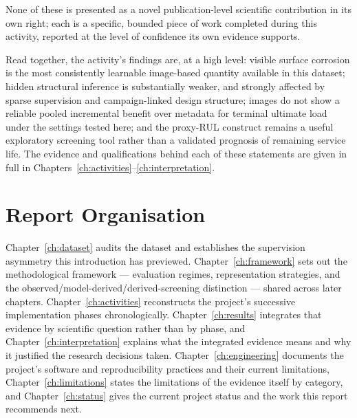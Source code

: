 None of these is presented as a novel publication-level scientific
contribution in its own right; each is a specific, bounded piece of work
completed during this activity, reported at the level of confidence its
own evidence supports.

Read together, the activity's findings are, at a high level: visible
surface corrosion is the most consistently learnable image-based quantity
available in this dataset; hidden structural inference is substantially
weaker, and strongly affected by sparse supervision and campaign-linked
design structure; images do not show a reliable pooled incremental
benefit over metadata for terminal ultimate load under the settings
tested here; and the proxy-RUL construct remains a useful exploratory
screening tool rather than a validated prognosis of remaining service
life. The evidence and qualifications behind each of these statements are
given in full in Chapters~\ref{ch:activities}--\ref{ch:interpretation}.

\section{Report Organisation}
\label{sec:intro-organisation}

Chapter~\ref{ch:dataset} audits the dataset and establishes the
supervision asymmetry this introduction has previewed.
Chapter~\ref{ch:framework} sets out the methodological framework —
evaluation regimes, representation strategies, and the
observed/model-derived/derived-screening distinction — shared across later
chapters. Chapter~\ref{ch:activities} reconstructs the project's
successive implementation phases chronologically.
Chapter~\ref{ch:results} integrates that evidence by scientific question
rather than by phase, and Chapter~\ref{ch:interpretation} explains what
the integrated evidence means and why it justified the research decisions
taken. Chapter~\ref{ch:engineering} documents the project's software and
reproducibility practices and their current limitations,
Chapter~\ref{ch:limitations} states the limitations of the evidence itself
by category, and Chapter~\ref{ch:status} gives the current project status
and the work this report recommends next.
